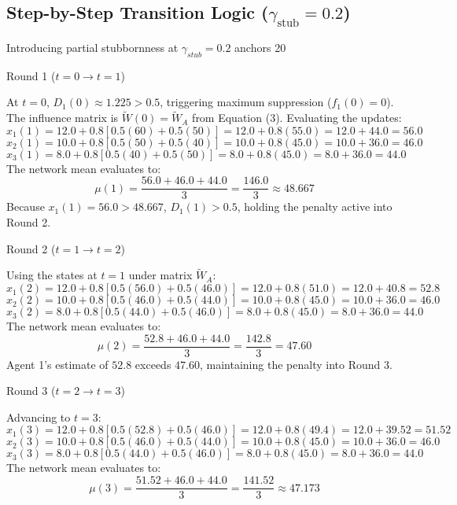 \subsection{Step-by-Step Transition Logic ($\gamma_{\text{stub}} = 0.2$)}
Introducing partial stubbornness at $\gamma_{stub} = 0.2$ anchors 20%

Round 1 ($t = 0 \to t = 1$)

At $t = 0$, $D_1(0) \approx 1.225 > 0.5$, triggering maximum suppression ($f_1(0) = 0$)\cite{degroot1974reaching}. The influence matrix is $\tilde{W}(0) = \tilde{W}_A$ from Equation (3)\cite{acemoglu2013opinion}. Evaluating the updates\cite{degroot1974reaching}: $$x_1(1) = 12.0 + 0.8 [0.5(60) + 0.5(50)] = 12.0 + 0.8(55.0) = 12.0 + 44.0 = 56.0$$ $$x_2(1) = 10.0 + 0.8 [0.5(50) + 0.5(40)] = 10.0 + 0.8(45.0) = 10.0 + 36.0 = 46.0$$ $$x_3(1) = 8.0 + 0.8 [0.5(40) + 0.5(50)] = 8.0 + 0.8(45.0) = 8.0 + 36.0 = 44.0$$ The network mean evaluates to\cite{degroot1974reaching}: $$\mu(1) = \frac{56.0 + 46.0 + 44.0}{3} = \frac{146.0}{3} \approx 48.667$$ Because $x_1(1) = 56.0 > 48.667$, $D_1(1) > 0.5$, holding the penalty active into Round 2\cite{degroot1974reaching}.

Round 2 ($t = 1 \to t = 2$)

Using the states at $t = 1$ under matrix $\tilde{W}_A$\cite{degroot1974reaching}: $$x_1(2) = 12.0 + 0.8 [0.5(56.0) + 0.5(46.0)] = 12.0 + 0.8(51.0) = 12.0 + 40.8 = 52.8$$ $$x_2(2) = 10.0 + 0.8 [0.5(46.0) + 0.5(44.0)] = 10.0 + 0.8(45.0) = 10.0 + 36.0 = 46.0$$ $$x_3(2) = 8.0 + 0.8 [0.5(44.0) + 0.5(46.0)] = 8.0 + 0.8(45.0) = 8.0 + 36.0 = 44.0$$ The network mean evaluates to\cite{degroot1974reaching}: $$\mu(2) = \frac{52.8 + 46.0 + 44.0}{3} = \frac{142.8}{3} = 47.60$$ Agent 1's estimate of $52.8$ exceeds $47.60$, maintaining the penalty into Round 3\cite{degroot1974reaching}.

Round 3 ($t = 2 \to t = 3$)

Advancing to $t = 3$\cite{degroot1974reaching}: $$x_1(3) = 12.0 + 0.8 [0.5(52.8) + 0.5(46.0)] = 12.0 + 0.8(49.4) = 12.0 + 39.52 = 51.52$$ $$x_2(3) = 10.0 + 0.8 [0.5(46.0) + 0.5(44.0)] = 10.0 + 0.8(45.0) = 10.0 + 36.0 = 46.0$$ $$x_3(3) = 8.0 + 0.8 [0.5(44.0) + 0.5(46.0)] = 8.0 + 0.8(45.0) = 8.0 + 36.0 = 44.0$$ The network mean evaluates to\cite{degroot1974reaching}: $$\mu(3) = \frac{51.52 + 46.0 + 44.0}{3} = \frac{141.52}{3} \approx 47.173$$

